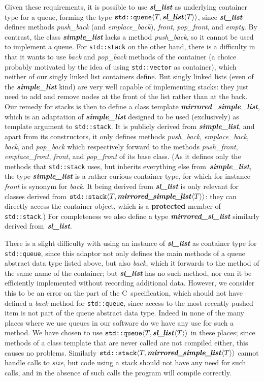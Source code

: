 \documentclass[12pt]{article}
\theoremstyle{plain}
\theoremstyle{definition}
\def\PP{\copy\PPbox}
\newcommand\Cee{\textsc{C}}
\newcommand\Cpp{\Cee\PP}
\newcommand\std[1]{\texttt{std::#1}}
\def\vect.{\std{vector}}
\def\slls.{\textbf{\textit{sl\_\!list}}}
\def\smpl.{\textbf{\textit{simple\_\!list}}}
\def\mspl.{\textbf{\textit{mirrored\_\!simple\_\!list}}}
\def\msll.{\textbf{\textit{mirrored\_\!sl\_\!list}}}
\def\ang#1{\langle#1\rangle}
\begin{document}
Given these requirements, it is possible to use \slls. as underlying container
type for a queue, forming the type $\std{queue}\ang{T,\slls.\ang{T}}$, since
\slls. defines methods \textit{push\_back} (and \textit{emplace\_back}),
\textit{front}, \textit{pop\_front}, and \textit{empty}. By contrast, the class
\smpl. lacks a method \textit{push\_back}, so it cannot be used to implement a
queue. For \std{stack} on the other hand, there is a difficulty in that it wants
to use \textit{back} and \textit{pop\_back} methods of the container (a choice
probably motivated by the idea of using \vect. as container), which
neither of our singly linked list containers define. But singly linked lists
(even of the \smpl. kind) are very well capable of implementing stacks: they
just need to add and remove nodes at the front of the list rather than at the
back. Our remedy for stacks is then to define a class template \mspl., which is
an adaptation of \smpl. designed to be used (exclusively) as template argument
to \std{stack}. It is publicly derived from \smpl., and apart from its
constructors, it only defines methods \textit{push\_back},
\textit{emplace\_back}, \textit{back}, and \textit{pop\_back} which respectively
forward to the methods \textit{push\_front}, \textit{emplace\_front},
\textit{front}, and \textit{pop\_front} of its base class. (As it defines only
the methods that \std{stack} uses, but inherits everything else from~\smpl.,
the type \smpl. is a rather curious container type, for which for instance
\textit{front} is synonym for \textit{back}. It being derived from \slls. is
only relevant for classes derived from $\std{stack}\langle T,\mspl.\ang
T\rangle$: they can directly access the container object, which is a
\textbf{protected} member of \std{stack}.) For completeness we also define a
type \msll. similarly derived from~\slls..

There is a slight difficulty with using an instance of \slls. as container type
for \std{queue}, since this adaptor not only defines the main methods of a queue
abstract data type listed above, but also \textit{back}, which it forwards to
the method of the same name of the container; but \slls. has no such method, nor
can it be efficiently implemented without recording additional data. However, we
consider this to be an error on the part of the \Cpp\ specification, which
should not have defined a \textit{back} method for \std{queue}, since access to
the most recently pushed item is not part of the queue abstract data type.
Indeed in none of the many places where we use queues in our software do we have
any use for such a method. We have chosen to use $\std{queue}\langle
T,\slls.\ang T\rangle$ in these places; since methods of a class template that
are never called are not compiled either, this causes no problems. Similarly
$\std{stack}\langle T,\mspl.\ang T\rangle$ cannot handle calls to \textit{size},
but code using a stack should not have any need for such calls, and in the
absence of such calls the program will compile correctly.
\end{document}
